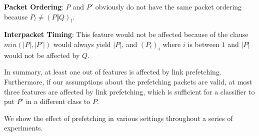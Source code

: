 {\bf Packet Ordering}:
$P$ and $P'$ obviously do not have the same packet ordering because $P_l \neq (P \Vert Q)_l$.

{\bf Interpacket Timing}:
This feature would not be affected because of the clause $\mathit{min}(|P|,|P'|)$ would always yield $|P|$, and $(P_t)_i$ where $i$ is between $1$ and $|P|$ would not be affected by $Q$.

In summary, at least one out of features is affected by link prefetching.
Furthermore, if our assumptions about the prefetching packets are valid, at most three features are affected by link prefetching, which is sufficient for a classifier to put $P'$ in a different class to $P$.

We show the effect of prefetching in various settings throughout a series of experiments.

